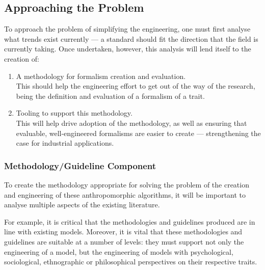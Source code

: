 \subsection{Approaching the Problem}\label{sec:approaching_the_problem}

To approach the problem of simplifying the engineering, one must first analyse what trends exist currently --- a standard should fit the direction that the field is currently taking. Once undertaken, however, this analysis will lend itself to the creation of:
\begin{enumerate}
    \item A methodology for formalism creation and evaluation.\\
    This should help the engineering effort to get out of the way of the research, being the definition and evaluation of a formalism of a trait.
    \item Tooling to support this methodology.\\
    This will help drive adoption of the methodology, as well as ensuring that evaluable, well-engineered formalisms are easier to create --- strengthening the case for industrial applications.
\end{enumerate}

\subsubsection*{Methodology/Guideline Component}\label{sec:methodology}
To create the methodology appropriate for solving the problem of the creation and engineering of these anthropomorphic algorithms, it will be important to analyse multiple aspects of the existing literature.\par

For example, it is critical that the methodologies and guidelines produced are in line with existing models. Moreover, it is vital that these methodologies and guidelines are suitable at a number of levels: they must support not only the engineering of a model, but the engineering of models with psychological, sociological, ethnographic or philosophical perspectives on their respective traits.\par

